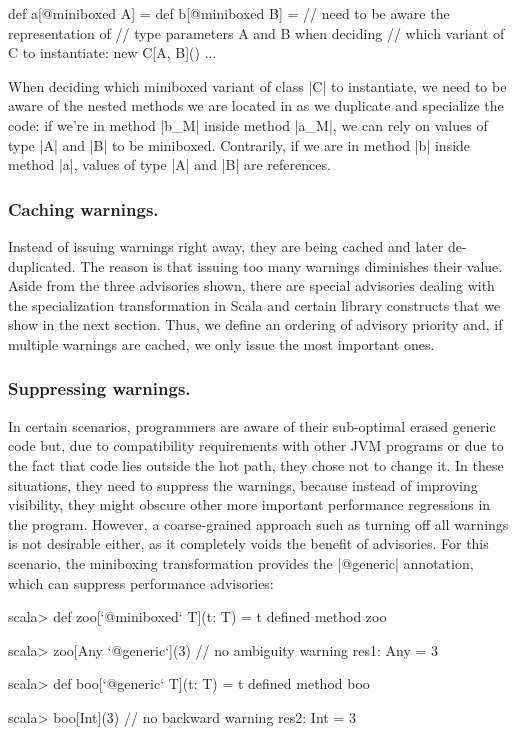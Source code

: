 \begin{lstlisting-nobreak}
 def a[@miniboxed A] = {
   def b[@miniboxed B] = {
     // need to be aware the representation of
     // type parameters A and B when deciding
     // which variant of C to instantiate:
     new C[A, B]()
   }
   ...
 }
\end{lstlisting-nobreak}

When deciding which miniboxed variant of class |C| to instantiate, we need to be aware of the nested methods we are located in as we duplicate and specialize the code: if we're in method |b_M| inside method |a_M|, we can rely on values of type |A| and |B| to be miniboxed. Contrarily, if we are in method |b| inside method |a|, values of type |A| and |B| are references.



\subsubsection*{Caching warnings.} Instead of issuing warnings right away, they are being cached and later de-duplicated. The reason is that issuing too many warnings diminishes their value. Aside from the three advisories shown, there are special advisories dealing with the specialization transformation in Scala and certain library constructs that we show in the next section. Thus, we define an ordering of advisory priority and, if multiple warnings are cached, we only issue the most important ones.

\subsubsection*{Suppressing warnings.} In certain scenarios, programmers are aware of their sub-optimal erased generic code but, due to compatibility requirements with other JVM programs or due to the fact that code lies outside the hot path, they chose not to change it. In these situations, they need to suppress the warnings, because instead of improving visibility, they might obscure other more important performance regressions in the program. However, a coarse-grained approach such as turning off all warnings is not desirable either, as it completely voids the benefit of advisories. For this scenario, the miniboxing transformation provides the |@generic| annotation, which can suppress performance advisories:

\begin{lstlisting-nobreak}
 scala> def zoo[`@miniboxed` T](t: T) = t
 defined method zoo

 scala> zoo[Any `@generic`](3) // no ambiguity warning
 res1: Any = 3

 scala> def boo[`@generic` T](t: T) = t
 defined method boo

 scala> boo[Int](3)                   // no backward warning
 res2: Int = 3
\end{lstlisting-nobreak}



